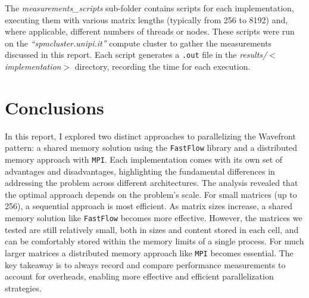 The \textit{measurements\_scripts} sub-folder contains scripts for each implementation, executing them with various matrix lengths (typically from 256 to 8192) and, where applicable, different numbers of threads or nodes. These scripts were run on the \textit{``spmcluster.unipi.it''} compute cluster to gather the measurements discussed in this report. Each script generates a \texttt{.out} file in the \textit{results/$<$implementation$>$} directory, recording the time for each execution. 

\section*{Conclusions}
In this report, I explored two distinct approaches to parallelizing the Wavefront pattern: a shared memory solution using the \texttt{FastFlow} library and a distributed memory approach with \texttt{MPI}. Each implementation comes with its own set of advantages and disadvantages, highlighting the fundamental differences in addressing the problem across different architectures. The analysis revealed that the optimal approach depends on the problem's scale. For small matrices (up to 256), a sequential approach is most efficient. As matrix sizes increase, a shared memory solution like \texttt{FastFlow} becomes more effective. However, the matrices we tested are still relatively small, both in sizes and content stored in each cell, and can be comfortably stored within the memory limits of a single process. For much larger matrices a distributed memory approach like \texttt{MPI} becomes essential. The key takeaway is to always record and compare performance measurements to account for overheads, enabling more effective and efficient parallelization strategies.